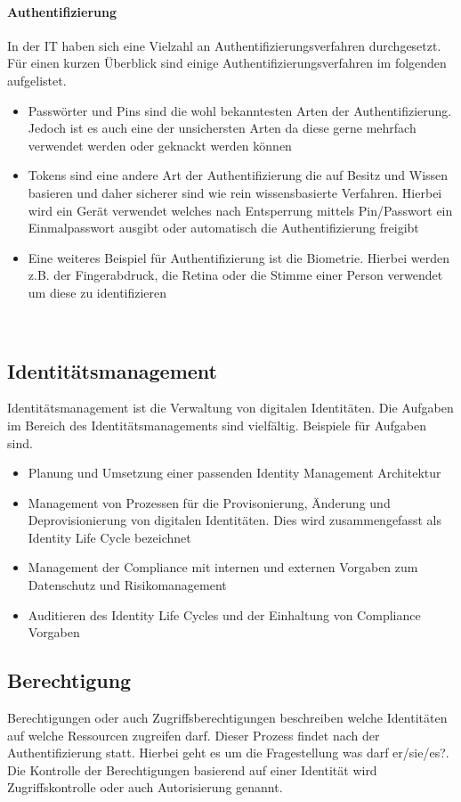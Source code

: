 \documentclass[10pt]{article}
\begin{document}
\paragraph{Authentifizierung}
In der IT haben sich eine Vielzahl an Authentifizierungsverfahren durchgesetzt. Für einen kurzen Überblick sind einige Authentifizierungsverfahren im folgenden aufgelistet.
\begin{itemize}
  \item Passwörter und Pins sind die wohl bekanntesten Arten der Authentifizierung. Jedoch ist es auch eine der unsichersten Arten da diese gerne mehrfach verwendet werden oder geknackt werden können
  \item Tokens sind eine andere Art der Authentifizierung die auf Besitz und Wissen basieren und daher sicherer sind wie rein wissensbasierte Verfahren. Hierbei wird ein Gerät verwendet welches nach Entsperrung mittels Pin/Passwort ein Einmalpasswort ausgibt oder automatisch die Authentifizierung freigibt
  \item Eine weiteres Beispiel für Authentifizierung ist die Biometrie. Hierbei werden z.B. der Fingerabdruck, die Retina oder die Stimme einer Person verwendet um diese zu identifizieren
\end{itemize}
~\cite{tsolkas2017}
\subsection{Identitätsmanagement}
Identitätsmanagement ist die Verwaltung von digitalen Identitäten. Die Aufgaben im Bereich des Identitätsmanagements sind vielfältig. Beispiele für Aufgaben sind.
\begin{itemize}
  \item Planung und Umsetzung einer passenden Identity Management Architektur~\cite{windley2005digital}
  \item Management von Prozessen für die Provisonierung, Änderung und Deprovisionierung von digitalen Identitäten. Dies wird zusammengefasst als Identity Life Cycle bezeichnet~\cite{sharma2016identity}
  \item Management der Compliance mit internen und externen Vorgaben zum Datenschutz und Risikomanagement~\cite{azhar2014economics}
  \item Auditieren des Identity Life Cycles und der Einhaltung von Compliance Vorgaben~\cite{peyton2007audit}~\cite{accorsi2008automated}
\end{itemize}
\subsection{Berechtigung}
Berechtigungen oder auch Zugriffsberechtigungen beschreiben welche Identitäten auf welche Ressourcen zugreifen darf. Dieser Prozess findet nach der Authentifizierung statt. Hierbei geht es um die Fragestellung \glqq{}was darf er/sie/es?\grqq{}. Die Kontrolle der Berechtigungen basierend auf einer Identität wird Zugriffskontrolle oder auch Autorisierung genannt.~\cite{tsolkas2017}
\end{document}
